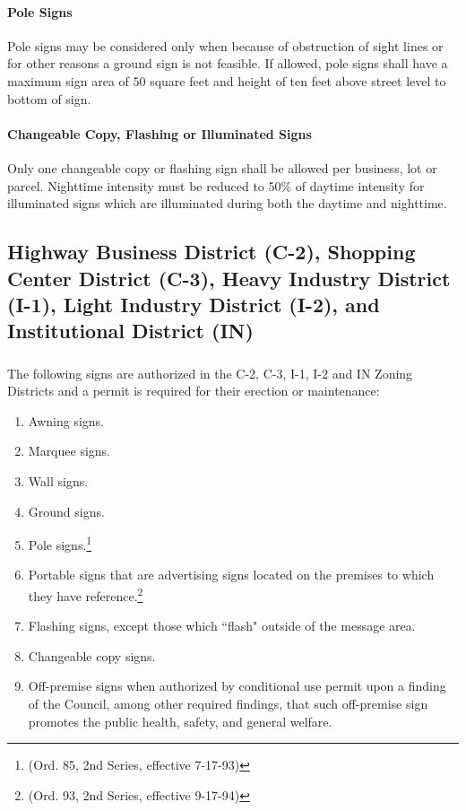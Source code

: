 \paragraph{Pole Signs}
Pole signs may be considered only when because of obstruction of sight lines or for other reasons a ground sign is not feasible.  If allowed, pole signs shall have a maximum sign area of 50 square feet and height of ten feet above street level to bottom of sign.
\paragraph{Changeable Copy, Flashing or Illuminated Signs}
Only one changeable copy or flashing sign shall be allowed per business, lot or parcel. Nighttime intensity must be reduced to 50\% of daytime intensity for illuminated signs which are illuminated during both the daytime and nighttime.
\subsection{Highway Business District (C-2), Shopping Center District (C-3), Heavy Industry District (I-1), Light Industry District (I-2), and Institutional District (IN)}
\subsubsection{}
The following signs are authorized in the C-2, C-3, I-1, I-2 and IN Zoning Districts and a permit is required for their erection or maintenance:
\begin{enumerate}[{\indent}a)]
    \item Awning signs.
    \item Marquee signs.
    \item Wall signs.
    \item Ground signs.
    \item Pole signs.\footnote{(Ord. 85, 2nd Series, effective 7-17-93)}
    \item Portable signs that are advertising signs located on the premises to which they have reference.\footnote{(Ord. 93, 2nd Series, effective 9-17-94)}
    \item Flashing signs, except those which “flash" outside of the message area.
    \item Changeable copy signs.
    \item Off-premise signs when authorized by conditional use permit upon a finding of the Council, among other required findings, that such off-premise sign promotes the public health, safety, and general welfare.
\end{enumerate}
